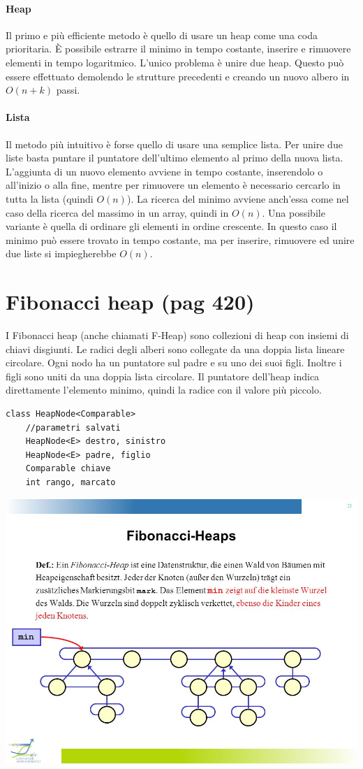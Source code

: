\documentclass[a4paper]{book}
\newcommand{\lstIndent}{4}
\begin{document}
\paragraph*{Heap}
Il primo e più efficiente metodo è quello di usare un heap come una coda prioritaria. È possibile estrarre il minimo in tempo costante, inserire e rimuovere elementi in tempo logaritmico. L'unico problema è unire due heap. Questo può essere effettuato demolendo le strutture precedenti e creando un nuovo albero in $O(n+k)$ passi.
\paragraph*{Lista}
Il metodo più intuitivo è forse quello di usare una semplice lista. Per unire due liste basta puntare il puntatore dell'ultimo elemento al primo della nuova lista. L'aggiunta di un nuovo elemento avviene in tempo costante, inserendolo o all'inizio o alla fine, mentre per rimuovere un elemento è necessario cercarlo in tutta la lista (quindi $O(n)$). La ricerca del minimo avviene anch'essa come nel caso della ricerca del massimo in un array, quindi in $O(n)$. Una possibile variante è quella di ordinare gli elementi in ordine crescente. In questo caso il minimo può essere trovato in tempo costante, ma per inserire, rimuovere ed unire due liste si impiegherebbe $O(n)$.
\section{Fibonacci heap (pag 420)}
I Fibonacci heap (anche chiamati F-Heap) sono collezioni di heap con insiemi di chiavi disgiunti. Le radici degli alberi sono collegate da una doppia lista lineare circolare. Ogni nodo ha un puntatore sul padre e su uno dei suoi figli. Inoltre i figli sono uniti da una doppia lista circolare. Il puntatore dell'heap indica direttamente l'elemento minimo, quindi la radice con il valore più piccolo.
\begin{lstlisting}[tabsize=\lstIndent]
class HeapNode<Comparable>
	//parametri salvati
	HeapNode<E> destro, sinistro
	HeapNode<E> padre, figlio
	Comparable chiave
	int rango, marcato
\end{lstlisting}
\begin{center}
\includegraphics[scale=0.5]{Figures/fheap.jpg}
\end{center}
\end{document}
